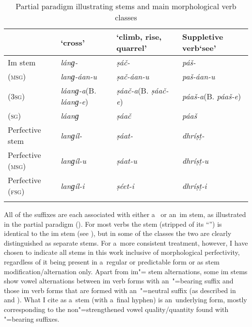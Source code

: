 \begin{table}[ht]
\caption{Partial paradigm illustrating stems and main morphological verb classes}

\begin{tabularx}{\textwidth}{ l P{20mm} Q P{27mm} }
\lsptoprule
& \newline `cross' &
\newline `climb, rise, quarrel' &
Suppletive verb\newline `see'\\\hline
Im stem &
\textit{lánɡ-} &
\textit{ṣáč-} &
\textit{páš-} \\
 (\textsc{msg}) &
\textit{lanɡ-áan-u} &
\textit{ṣač-áan-u} &
\textit{paš-áan-u} \\
 (\textsc{3sg}) &
\textit{láanɡ-a}\newline (B. \textit{láanɡ-e}) &
\textit{ṣáač-a}\newline (B. \textit{ṣáač-e}) &
\textit{páaš-a}\newline (B. \textit{páaš-e}) \\
 (\textsc{sg}) &
\textit{láanɡ} &
\textit{ṣáač} &
\textit{páaš} \\
Perfective stem &
\textit{lanɡíl-} &
\textit{ṣáat-} &
\textit{dhríṣṭ-} \\
Perfective (\textsc{msg}) &
\textit{lanɡíl-u} &
\textit{ṣáat-u} &
\textit{dhríṣṭ-u} \\
Perfective (\textsc{fsg}) &
\textit{lanɡíl-i} &
\textit{ṣéet-i} &
\textit{dhríṣṭ-i} \\\lspbottomrule
\end{tabularx}
\label{tab:8-3}
\end{table}


All of the  suffixes are each associated with either a~ or an~im
stem, as illustrated in the partial paradigm (). For most verbs the  stem
(stripped of its  ``'') is identical to the im stem (see ), but
in some of the classes the two are clearly distinguished as separate stems. For a~more consistent
treatment, however, I have chosen to indicate all  stems in this work inclusive of
morphological perfectivity, regardless of it being present in a~regular or predictable form or as
stem modification/alternation only. Apart from im"= stem alternations, some
im stems show vowel alternations between im verb forms with an~"=bearing
suffix and those im verb forms that are formed with an~"=neutral suffix (as described
in  and ). What I cite as a~stem (with a~final hyphen) is an~underlying form, mostly
corresponding to the non"=strengthened vowel quality/quantity found with "=bearing suffixes.


